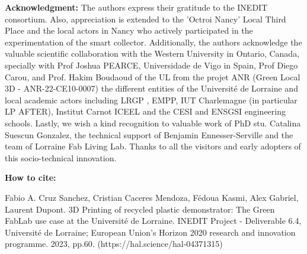 \textbf{Acknowledgment:}\newline
The authors express their gratitude to the INEDIT consortium. 
Also, appreciation is extended to the 'Octroi Nancy' Local Third Place and 
the local actors in Nancy who actively participated in the experimentation of the smart collector. 
Additionally, the authors acknowledge the valuable scientific collaboration with the Western University in Ontario, Canada, specially with Prof Joshua PEARCE, 
Universidade de Vigo in Spain, Prof Diego Carou, and Prof. Hakim Boudaoud of the UL from the projet ANR (Green Local 3D - ANR-22-CE10-0007)
the different entities of the Université de Lorraine and local academic actors including LRGP , EMPP, IUT Charlemagne (in particular LP AFTER),
Institut Carnot ICEEL  and the  CESI and ENSGSI engineering schools.
Lastly, we wish a kind recognition to valuable work of PhD stu. Catalina Suescun Gonzalez, the technical support of Benjamin Ennesser-Serville and the team of Lorraine Fab Living Lab.   
Thanks to all the visitors and early adopters of this socio-technical innovation.

\vspace{2cm}

\textbf{How to cite:} \newline

Fabio A. Cruz Sanchez, Cristian Caceres Mendoza, Fédoua Kasmi, Alex Gabriel, Laurent Dupont. 3D Printing of recycled plastic demonstrator: The Green FabLab use case at the Université de Lorraine. INEDIT Project - Deliverable 6.4, Université de Lorraine; European Union’s Horizon 2020 research and innovation programme. 2023, pp.60. (https://hal.science/hal-04371315)


\vfill
\newpage
